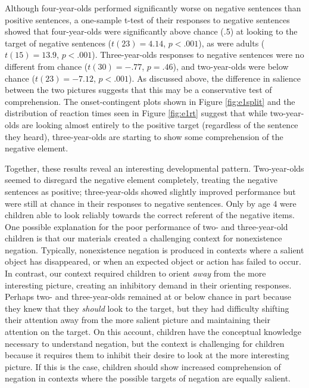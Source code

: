 \documentclass[man]{apa2}
\begin{document}
Although four-year-olds performed significantly worse on negative sentences than positive sentences, a one-sample t-test of their responses to negative sentences showed that four-year-olds were significantly above chance (.5) at looking to the target of negative sentences ($t(23) = 4.14$, $p< .001$), as were adults ($t(15) = 13.9$, $p< .001$).  Three-year-olds responses to negative sentences were no different from chance ($t(30) = -.77$, $p=.46$), and two-year-olds were below chance ($t(23) = -7.12$, $p< .001$).  As discussed above, the difference in salience between the two pictures suggests that this may be a conservative test of comprehension.  The onset-contingent plots shown in Figure \ref{fig:e1split} and the distribution of reaction times seen in Figure \ref{fig:e1rt} suggest that while two-year-olds are looking almost entirely to the positive target (regardless of the sentence they heard), three-year-olds are starting to show some comprehension of the negative element.   

Together, these results reveal an interesting developmental pattern. Two-year-olds seemed to disregard the negative element completely, treating the negative sentences as positive; three-year-olds showed slightly improved performance but were still at chance in their responses to negative sentences.  Only by age 4 were children able to look reliably towards the correct referent of the negative items.  One possible explanation for the poor performance of two- and three-year-old children is that our materials created a challenging context for nonexistence negation.  Typically, nonexistence negation is produced in contexts where a salient object has disappeared, or when an expected object or action has failed to occur.  In contrast, our context required children to orient \emph{away} from the more interesting picture, creating an inhibitory demand in their orienting responses.  Perhaps two- and three-year-olds remained at or below chance in part because they knew that they \emph{should} look to the target, but they had difficulty shifting their attention away from the more salient picture and maintaining their attention on the target.  On this account, children have the conceptual knowledge necessary to understand negation, but the context is challenging for children because it requires them to inhibit their desire to look at the more interesting picture. If this is the case, children should show increased comprehension of negation in contexts where the possible targets of negation are equally salient.
\end{document}
